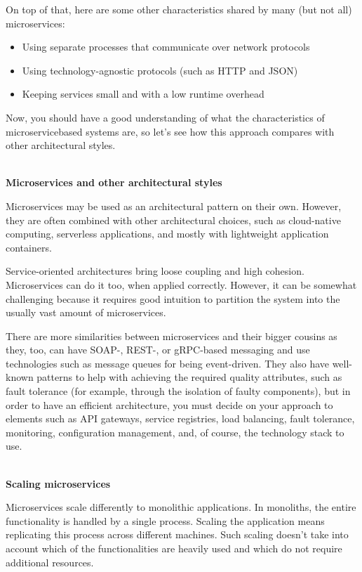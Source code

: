 On top of that, here are some other characteristics shared by many (but not all) microservices:

\begin{itemize}
\item	
Using separate processes that communicate over network protocols
	
\item
Using technology-agnostic protocols (such as HTTP and JSON)

\item
Keeping services small and with a low runtime overhead
\end{itemize}

Now, you should have a good understanding of what the characteristics of microservicebased systems are, so let's see how this approach compares with other architectural styles.

\hspace*{\fill} \\ %
\noindent
\textbf{Microservices and other architectural styles}

Microservices may be used as an architectural pattern on their own. However, they are often combined with other architectural choices, such as cloud-native computing, serverless applications, and mostly with lightweight application containers.

Service-oriented architectures bring loose coupling and high cohesion. Microservices can do it too, when applied correctly. However, it can be somewhat challenging because it requires good intuition to partition the system into the usually vast amount of microservices.

There are more similarities between microservices and their bigger cousins as they, too, can have SOAP-, REST-, or gRPC-based messaging and use technologies such as message queues for being event-driven. They also have well-known patterns to help with achieving the required quality attributes, such as fault tolerance (for example, through the isolation of faulty components), but in order to have an efficient architecture, you must decide on your approach to elements such as API gateways, service registries, load balancing, fault tolerance, monitoring, configuration management, and, of course, the technology stack to use.

\hspace*{\fill} \\ %
\noindent
\textbf{Scaling microservices}

Microservices scale differently to monolithic applications. In monoliths, the entire functionality is handled by a single process. Scaling the application means replicating this process across different machines. Such scaling doesn't take into account which of the functionalities are heavily used and which do not require additional resources.

